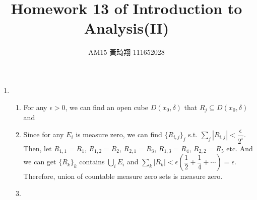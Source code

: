 \documentclass[12pt]{article}
\title{Homework 13 of Introduction to Analysis(II)}
\author{AM15 黃琦翔 111652028}
\begin{document}
\maketitle
\begin{enumerate}
    \item \begin{enumerate}
        \item For any $\epsilon > 0$, 
        we can find an open cube $D(x_0, \delta)$ that $R_j \subseteq D(x_0, \delta)$ and 

        \item Since for any $E_i$ is measure zero, we can find $\{ R_{i, j}\}_j$ s.t. 
        $\displaystyle\sum_{j} |R_{i, j}| < \dfrac{\epsilon}{2^{i}}$.
        Then, let $R_{1, 1} = R_1$, $R_{1,2} = R_2$, $R_{2, 1} = R_3$, $R_{1, 3} = R_4$, $R_{2, 2} = R_5$ etc.
        And we can get $\{ R_k\}_k$ contains $\displaystyle\bigcup_i E_i$ and $\displaystyle\sum_{k} |R_k| < \epsilon(\dfrac{1}{2} + \dfrac{1}{4} + \cdots) = \epsilon$.
        Therefore, union of countable measure zero sets is measure zero.

        \item 

    \end{enumerate}
\end{enumerate}
\end{document}
